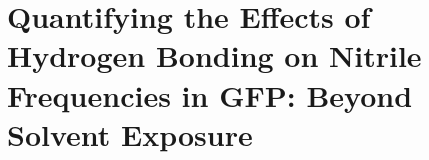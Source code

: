 \chapter{Quantifying the Effects of Hydrogen Bonding on Nitrile Frequencies in GFP: Beyond Solvent Exposure}\label{gfp-hbond}


